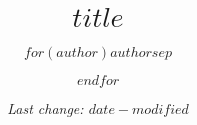 \title{$title$}
\author{$for(author)$$author$$sep$ \and $endfor$}
\date{\small{\textit{Last change: $date-modified$}}}